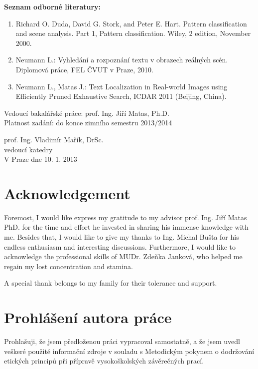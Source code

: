 \documentclass[12pt,a4paper]{report}
\begin{document}
\textbf{Seznam odborné literatury:}
\begin{enumerate}
    \item Richard O. Duda, David G. Stork, and Peter E. Hart. Pattern classification and scene analysis. Part 1, Pattern classification. Wiley, 2 edition, November 2000.
    \item Neumann L.: Vyhledání a rozpoznání textu v obrazech reálných scén. Diplomová práce, FEL ČVUT v Praze, 2010.
    \item Neumann L., Matas J.: Text Localization in Real-world Images using Efficiently Pruned Exhaustive Search, ICDAR 2011 (Beijing, China).
\end{enumerate}

\noindent
Vedoucí bakalářské práce: prof. Ing. Jiří Matas, Ph.D. \\
Platnost zadání: do konce zimního semestru 2013/2014

\vfill
\noindent
prof. Ing. Vladimír Mařík, DrSc. \\
vedoucí katedry \\
V Praze dne 10. 1. 2013

\clearpage
\thispagestyle{empty}
\mbox{}
\clearpage

\chapter*{Acknowledgement}
Foremost, I would like express my gratitude to my advisor prof. Ing. Jiří Matas PhD. for the time and effort he invested in sharing his immense knowledge with me. Besides that, I would like to give my thanks to Ing. Michal Bušta for his endless enthusiasm and interesting discussions. Furthermore, I would like to acknowledge the professional skills of MUDr. Zdeňka Janková, who helped me regain my lost concentration and stamina.

A special thank belongs to my family for their tolerance and support.

\chapter*{Prohlášení autora práce}
Prohlašuji, že jsem předloženou práci vypracoval samostatně, a že jsem uvedl veškeré použité informační zdroje v souladu s Metodickým pokynem o dodržování etických principů při přípravě vysokoškolských závěrečných prací.
\end{document}
